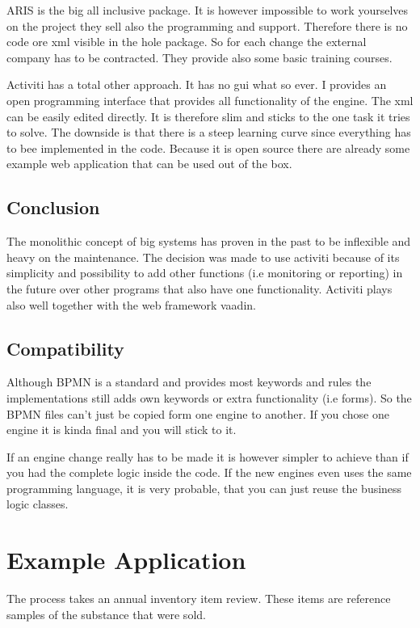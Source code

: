 \documentclass[paper=a4,twoside=false,BCOR=0mm,DIV=calc,fontsize=12pt]{scrartcl}
\begin{document}
ARIS is the big all inclusive package. It is however impossible to work yourselves on the project they sell also the programming and support. Therefore there is no code ore xml visible in the hole package. So for each change the external company has to be contracted.
They provide also some basic training courses.

Activiti has a total other approach. It has no gui what so ever. I provides an open programming interface that provides all functionality 
of the engine. The xml can be easily edited directly. It is therefore slim and sticks to the one task it tries to solve.
The downside is that there is a steep learning curve since everything has to bee implemented in the code. 
Because it is open source there are already some example web application that can be used out of the box. 

\subsection{Conclusion}
The monolithic concept of big systems has proven in the past to be inflexible and heavy on the maintenance. 
The decision was made to use activiti because of its simplicity and possibility to add other functions (i.e monitoring or reporting) in the future over other programs that also have one functionality.
Activiti plays also well together with the web framework vaadin.


\subsection{Compatibility}
Although BPMN is a standard and provides most keywords and rules the implementations still adds own keywords or extra functionality (i.e
forms). So the BPMN files can't just be copied form one engine to another. If you chose one engine it is kinda final and you will stick to it.

If an engine change really has to be made it is however simpler to achieve than if you had the complete logic inside the code. If the new engines even
uses the same programming language, it is very probable, that you can just reuse the business logic classes. 



\section{Example Application}
The process takes an annual inventory item review. These items are reference samples of the substance that were sold.
\end{document}
